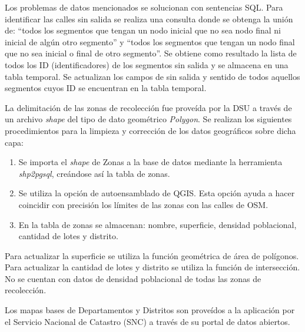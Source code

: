 Los problemas de datos mencionados se solucionan con sentencias SQL. Para identificar las calles sin salida se realiza una consulta donde se obtenga la unión de: ``todos los segmentos que tengan un nodo inicial que no sea nodo final ni inicial de algún otro segmento'' y ``todos los segmentos que tengan un nodo final que no sea inicial o final de otro segmento''. Se obtiene como resultado la lista de todos los ID (identificadores) de los segmentos sin salida y se almacena en una tabla temporal. Se actualizan los campos de sin salida y sentido de todos aquellos segmentos cuyos ID se encuentran en la tabla temporal.

La delimitación de las zonas de recolección fue proveída por la DSU a través de un archivo \textit{shape} del tipo de dato geométrico \textit{Polygon}. Se realizan los siguientes procedimientos para la limpieza y corrección de los datos geográficos sobre dicha capa:

\begin{enumerate}
\item Se importa el \textit{shape} de Zonas a la base de datos mediante la herramienta \textit{shp2pgsql}, creándose así la tabla de zonas.
\item Se utiliza la opción de autoensamblado de QGIS. Esta opción ayuda a hacer coincidir con precisión los límites de las zonas con las calles de OSM.
\item En la tabla de zonas se almacenan: nombre, superficie, densidad poblacional, cantidad de lotes y distrito.
\end{enumerate}

Para actualizar la superficie se utiliza la función geométrica de área de polígonos. Para actualizar la cantidad de lotes y distrito se utiliza la función de intersección. No se cuentan con datos de densidad poblacional de todas las zonas de recolección.

Los mapas bases de Departamentos y Distritos son proveídos a la aplicación por el Servicio Nacional de Catastro (SNC) a través de su portal de datos abiertos.

